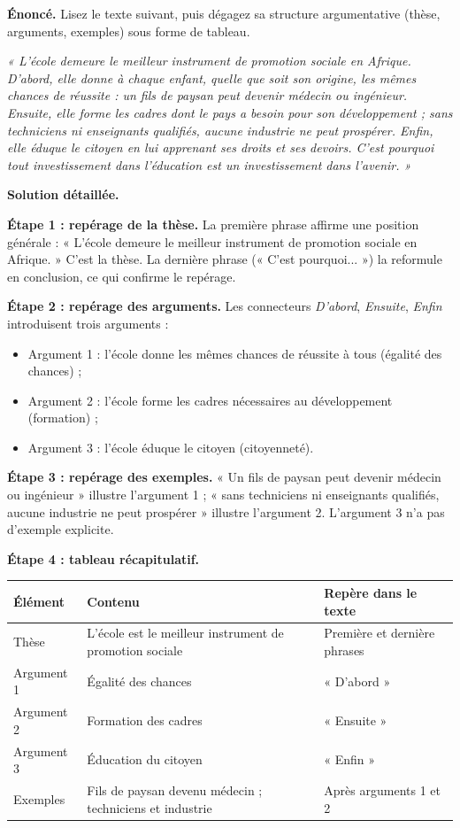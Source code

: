 \documentclass[11pt]{article}
\newcommand{\cle}[1]{{\popxbold\color{popdark}#1}}
\begin{document}
\begin{exoresolu}
\textbf{Énoncé.} Lisez le texte suivant, puis dégagez sa structure argumentative (thèse, arguments, exemples) sous forme de tableau.

\emph{« L'école demeure le meilleur instrument de promotion sociale en Afrique. D'abord, elle donne à chaque enfant, quelle que soit son origine, les mêmes chances de réussite : un fils de paysan peut devenir médecin ou ingénieur. Ensuite, elle forme les cadres dont le pays a besoin pour son développement ; sans techniciens ni enseignants qualifiés, aucune industrie ne peut prospérer. Enfin, elle éduque le citoyen en lui apprenant ses droits et ses devoirs. C'est pourquoi tout investissement dans l'éducation est un investissement dans l'avenir. »}

\tcblower
\textbf{Solution détaillée.}

\textbf{Étape 1 : repérage de la thèse.} La première phrase affirme une position générale : « L'école demeure le meilleur instrument de promotion sociale en Afrique. » C'est la \cle{thèse}. La dernière phrase (« C'est pourquoi... ») la reformule en conclusion, ce qui confirme le repérage.

\textbf{Étape 2 : repérage des arguments.} Les connecteurs \emph{D'abord}, \emph{Ensuite}, \emph{Enfin} introduisent trois arguments :
\begin{itemize}
\item Argument 1 : l'école donne les mêmes chances de réussite à tous (égalité des chances) ;
\item Argument 2 : l'école forme les cadres nécessaires au développement (formation) ;
\item Argument 3 : l'école éduque le citoyen (citoyenneté).
\end{itemize}

\textbf{Étape 3 : repérage des exemples.} « Un fils de paysan peut devenir médecin ou ingénieur » illustre l'argument 1 ; « sans techniciens ni enseignants qualifiés, aucune industrie ne peut prospérer » illustre l'argument 2. L'argument 3 n'a pas d'exemple explicite.

\textbf{Étape 4 : tableau récapitulatif.}
\begin{center}
\begin{tabularx}{\linewidth}{|l|X|X|}\hline
\rowcolor{popblueL} \textbf{Élément} & \textbf{Contenu} & \textbf{Repère dans le texte} \\ \hline
Thèse & L'école est le meilleur instrument de promotion sociale & Première et dernière phrases \\ \hline
Argument 1 & Égalité des chances & « D'abord » \\ \hline
Argument 2 & Formation des cadres & « Ensuite » \\ \hline
Argument 3 & Éducation du citoyen & « Enfin » \\ \hline
Exemples & Fils de paysan devenu médecin ; techniciens et industrie & Après arguments 1 et 2 \\ \hline
\end{tabularx}
\end{center}


\end{exoresolu}
\end{document}
